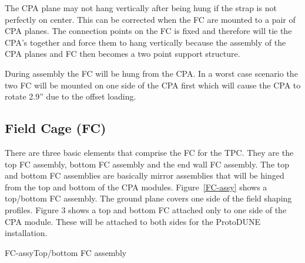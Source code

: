 The CPA plane may not hang vertically after being hung if the strap is not perfectly on center.  This can be corrected when the FC are mounted to a pair of CPA planes.  The connection points on the FC is fixed and therefore will tie the CPA’s together and force them to hang vertically because the assembly of the CPA planes and FC then becomes a two point support structure.  

During assembly the FC will be hung from the CPA.  In a worst case scenario the two FC will be mounted on one side of the CPA first which will cause the CPA to rotate 2.9'' due to the offset loading.  



\subsection{Field Cage (FC)}


There are three basic elements that comprise the FC for the TPC.  They are the top FC assembly, bottom FC assembly and the end wall FC assembly.  The top and bottom FC assemblies are basically mirror assemblies that will be hinged from the top and bottom of the CPA modules.  Figure~\ref{FC-assy} shows a top/bottom FC assembly.  The ground plane covers one side of the field shaping profiles.  Figure 3 shows a top and bottom FC attached only to one side of the CPA module.  These will be attached to both sides for the ProtoDUNE installation.  

\begin{cdrfigure}{FC-assy}{Top/bottom FC assembly }
\end{cdrfigure}

